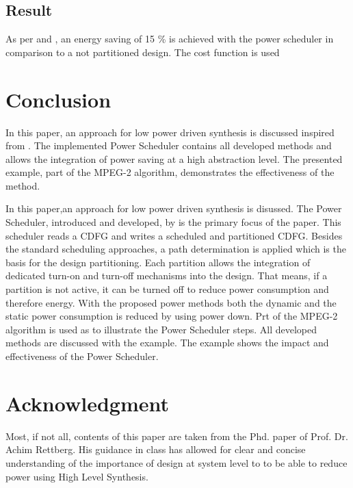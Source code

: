 \documentclass[conference]{IEEEtran}
\begin{document}
\subsection{Result}
As per \cite{10.1007/978-0-387-39362-9_24} and \cite{1581203}, an energy saving of 15 \% is achieved with the power scheduler in comparison to a not partitioned design. The cost function is used 


\section{Conclusion}
\label{sec: conclusion}
In this paper, an approach for low power driven synthesis is discussed inspired from \cite{Rett}. The implemented Power Scheduler contains all developed methods and allows the integration of power saving at a high abstraction level. The presented example, part of the MPEG-2 algorithm, demonstrates the effectiveness of the method.

In this paper,an approach for low power driven synthesis is disussed. The Power Scheduler, introduced and developed, by \cite{Ret} is the primary focus of the paper. This scheduler reads a CDFG and writes a scheduled and partitioned CDFG. Besides the standard scheduling approaches, a path determination is applied which is the basis for the design partitioning. Each partition allows the integration of dedicated turn-on and turn-off mechanisms into the design. That means, if a partition is not active, it can be turned off to reduce power consumption and therefore energy. With the proposed power methods both the dynamic and the static power consumption is reduced by using power down. Prt of the MPEG-2 algorithm is used as to illustrate the Power Scheduler steps. All developed methods are discussed with the example. The example shows the impact and effectiveness of the Power Scheduler.
\section*{Acknowledgment}
Most, if not all, contents of this paper are taken from the Phd. paper of Prof. Dr. Achim Rettberg. His guidance in class has allowed for clear and concise understanding of the importance of design at system level to to be able to reduce power using High Level Synthesis.



\printbibliography
\end{document}
